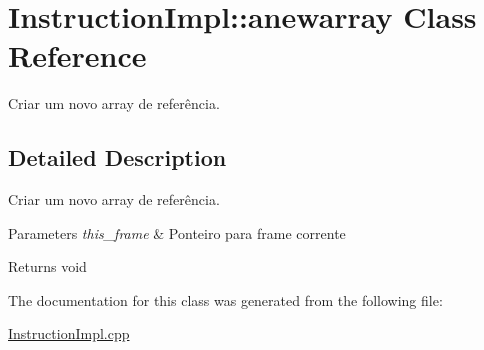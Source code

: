 \hypertarget{class_instruction_impl_1_1anewarray}{}\section{Instruction\+Impl\+:\+:anewarray Class Reference}
\label{class_instruction_impl_1_1anewarray}


Criar um novo array de referência.  




\subsection{Detailed Description}
Criar um novo array de referência. 


\begin{DoxyParams}{Parameters}
{\em this\+\_\+frame} & Ponteiro para frame corrente \\
\hline
\end{DoxyParams}
\begin{DoxyReturn}{Returns}
void 
\end{DoxyReturn}


The documentation for this class was generated from the following file\+:\begin{DoxyCompactItemize}
\item 
\hyperlink{_instruction_impl_8cpp}{Instruction\+Impl.\+cpp}\end{DoxyCompactItemize}
